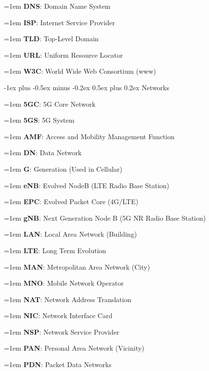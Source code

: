 \documentclass[letterpaper,8pt]{extarticle}
\makeatletter
\newcommand{\definition}[2]{
  \hangindent=1em
  \textbf{#1}: #2%
}
\renewcommand{\subsection}{\@startsection{subsection}{2}{0mm}%
  {-1ex plus -0.5ex minus -0.2ex}%
  {0.5ex plus 0.2ex}%
{\color{h2}\normalfont\fontsize{6}{6}\selectfont\bfseries}}
\makeatother
\begin{document}
\begin{multicols*}{5}
  \begin{multicols*}{2}
    
    \definition{DNS}{Domain Name System}
    
    \definition{ISP}{Internet Service Provider}
    
    \definition{TLD}{Top-Level Domain}
    
    \definition{URL}{Uniform Resource Locator}
    
    \definition{W3C}{World Wide Web Consortium (www)}
    
  \end{multicols*}
  
  \subsection{Networks}
  
  \begin{multicols*}{2}
    
    \definition{5GC}{5G Core Network}
    
    \definition{5GS}{5G System}
    
    \definition{AMF}{Access and Mobility Management Function}
    
    \definition{DN}{Data Network}
    
    \definition{G}{Generation (Used in Cellular)}
    
    \definition{eNB}{Evolved NodeB (LTE Radio Base Station)}
    
    \definition{EPC}{Evolved Packet Core (4G/LTE)}
    
    \definition{gNB}{Next Generation Node B (5G NR Radio Base Station)}
    
    \definition{LAN}{Local Area Network (Building)}
    
    \definition{LTE}{Long Term Evolution}
    
    \definition{MAN}{Metropolitan Area Network (City)}
    
    \definition{MNO}{Mobile Network Operator}
    
    \definition{NAT}{Network Address Translation}
    
    \definition{NIC}{Network Interface Card}
    
    \definition{NSP}{Network Service Provider}
    
    \definition{PAN}{Personal Area Network (Vicinity)}
    
    \definition{PDN}{Packet Data Networks}
    

\end{multicols*}
\end{multicols*}
\end{document}
